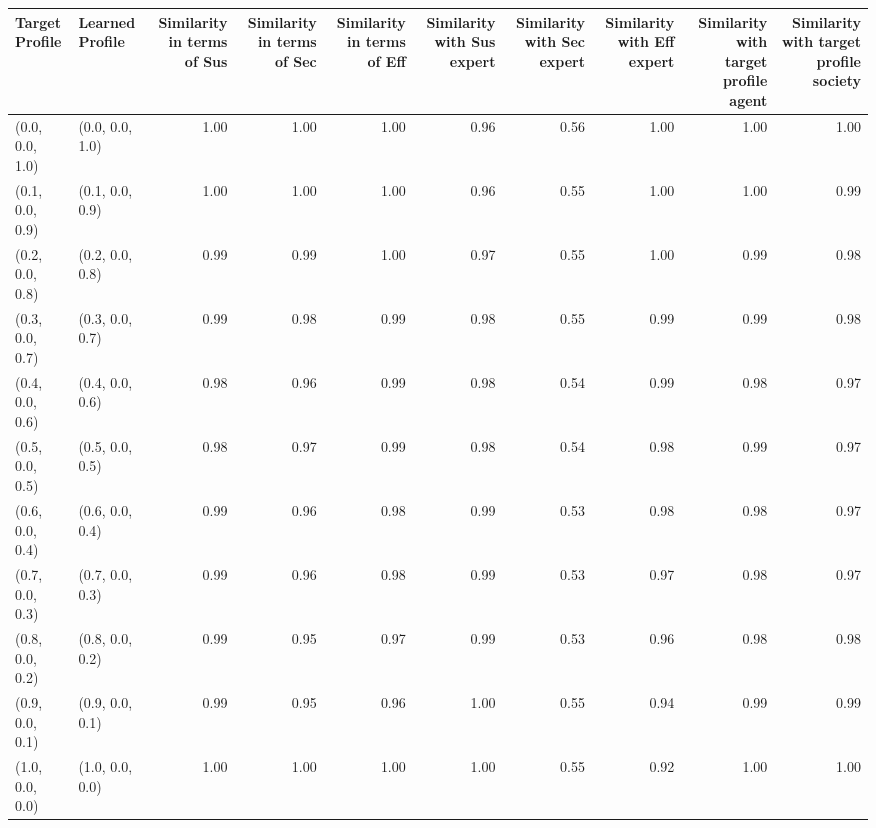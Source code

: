 \begin{tabular}{llrrrrrrrr}
\toprule
Target Profile & Learned Profile & Similarity in terms of Sus & Similarity in terms of Sec & Similarity in terms of Eff & Similarity with Sus expert & Similarity with Sec expert & Similarity with Eff expert & Similarity with target profile agent & Similarity with target profile society \\
\midrule
(0.0, 0.0, 1.0) & (0.0, 0.0, 1.0) & 1.00 & 1.00 & 1.00 & 0.96 & 0.56 & 1.00 & 1.00 & 1.00 \\
(0.1, 0.0, 0.9) & (0.1, 0.0, 0.9) & 1.00 & 1.00 & 1.00 & 0.96 & 0.55 & 1.00 & 1.00 & 0.99 \\
(0.2, 0.0, 0.8) & (0.2, 0.0, 0.8) & 0.99 & 0.99 & 1.00 & 0.97 & 0.55 & 1.00 & 0.99 & 0.98 \\
(0.3, 0.0, 0.7) & (0.3, 0.0, 0.7) & 0.99 & 0.98 & 0.99 & 0.98 & 0.55 & 0.99 & 0.99 & 0.98 \\
(0.4, 0.0, 0.6) & (0.4, 0.0, 0.6) & 0.98 & 0.96 & 0.99 & 0.98 & 0.54 & 0.99 & 0.98 & 0.97 \\
(0.5, 0.0, 0.5) & (0.5, 0.0, 0.5) & 0.98 & 0.97 & 0.99 & 0.98 & 0.54 & 0.98 & 0.99 & 0.97 \\
(0.6, 0.0, 0.4) & (0.6, 0.0, 0.4) & 0.99 & 0.96 & 0.98 & 0.99 & 0.53 & 0.98 & 0.98 & 0.97 \\
(0.7, 0.0, 0.3) & (0.7, 0.0, 0.3) & 0.99 & 0.96 & 0.98 & 0.99 & 0.53 & 0.97 & 0.98 & 0.97 \\
(0.8, 0.0, 0.2) & (0.8, 0.0, 0.2) & 0.99 & 0.95 & 0.97 & 0.99 & 0.53 & 0.96 & 0.98 & 0.98 \\
(0.9, 0.0, 0.1) & (0.9, 0.0, 0.1) & 0.99 & 0.95 & 0.96 & 1.00 & 0.55 & 0.94 & 0.99 & 0.99 \\
(1.0, 0.0, 0.0) & (1.0, 0.0, 0.0) & 1.00 & 1.00 & 1.00 & 1.00 & 0.55 & 0.92 & 1.00 & 1.00 \\
\bottomrule
\end{tabular}
